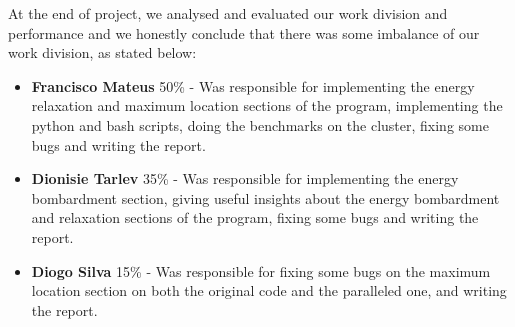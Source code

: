 At the end of project, we analysed and evaluated our work division and performance and we honestly conclude that there was some imbalance of our work division, as stated below:
\begin{itemize}
    \item \textbf{Francisco Mateus} 50\% - Was responsible for implementing the energy relaxation and maximum location sections of the program, implementing the python and bash scripts, doing the benchmarks on the cluster, fixing some bugs and writing the report.
    \item \textbf{Dionisie Tarlev}  35\% - Was responsible for implementing the energy bombardment section, giving useful insights about the energy bombardment and relaxation sections of the program, fixing some bugs and writing the report.
    \item \textbf{Diogo Silva}  15\% - Was responsible for fixing some bugs on the maximum location section on both the original code and the paralleled one, and writing the report.
\end{itemize}